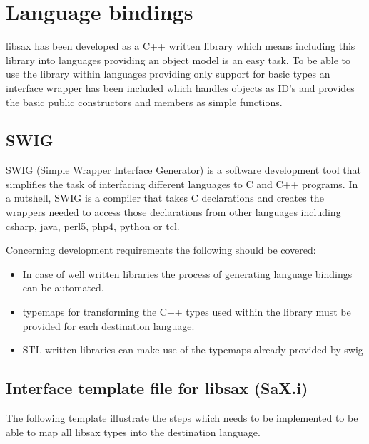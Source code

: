 \chapter{Language bindings}
\minitoc

libsax has been developed as a C++ written library which means
including this library into languages providing an object model
is an easy task. To be able to use the library within languages
providing only support for basic types an interface wrapper has
been included which handles objects as ID's and provides the basic
public constructors and members as simple functions.

\section{SWIG}

SWIG (Simple Wrapper Interface Generator) is a software development tool
that simplifies the task of
interfacing different languages to C and C++ programs. In a nutshell,
SWIG is a compiler that takes C declarations and creates the wrappers
needed to access those declarations from other languages
including csharp, java, perl5, php4, python or tcl.

Concerning development requirements the following should be covered:

\begin{itemize}
\item In case of well written libraries the process of generating
      language bindings can be automated.
\item typemaps for transforming the C++ types used within the library
      must be provided for each destination language.
\item STL written libraries can make use of the typemaps already
      provided by swig
\end{itemize}

\newpage

\section{Interface template file for libsax (SaX.i)}

The following template illustrate the steps which needs to be
implemented to be able to map all libsax types into the destination
language.

